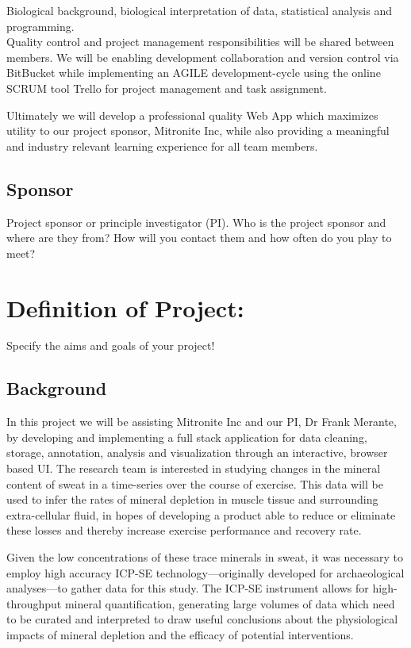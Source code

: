 \documentclass[10pt,twocolumn,letterpaper]{article}
\begin{document}
                Biological background, biological interpretation of data, statistical analysis and programming. \\

            Quality control and project management responsibilities will be shared between members. We will be enabling development collaboration and version control via BitBucket while implementing an AGILE development-cycle using the online SCRUM tool Trello for project management and task assignment.

            Ultimately we will develop a professional quality Web App which maximizes utility to our project sponsor, Mitronite Inc, while also providing a meaningful and industry relevant learning experience for all team members.

            \subsection{Sponsor}

            Project sponsor or principle investigator (PI). Who is the project sponsor and where are they from? How will you contact them and how often do you play to meet?

		\section{Definition of Project:}

        Specify the aims and goals of your project!

            \subsection{Background}

            In this project we will be assisting Mitronite Inc and our PI, Dr Frank Merante, by developing and implementing a full stack application for data cleaning, storage, annotation, analysis and visualization through an interactive, browser based UI. The research team is interested in studying changes in the mineral content of sweat in a time-series over the course of exercise. This data will be used to infer the rates of mineral depletion in muscle tissue and surrounding extra-cellular fluid, in hopes of developing a product able to reduce or eliminate these losses and thereby increase exercise performance and recovery rate.

            Given the low concentrations of these trace minerals in sweat, it was necessary to employ high accuracy ICP-SE technology---originally developed for archaeological analyses---to gather data for this study. The ICP-SE instrument allows for high-throughput mineral quantification, generating large volumes of data which need to be curated and interpreted to draw useful conclusions about the physiological impacts of mineral depletion and the efficacy of potential interventions.
\end{document}
